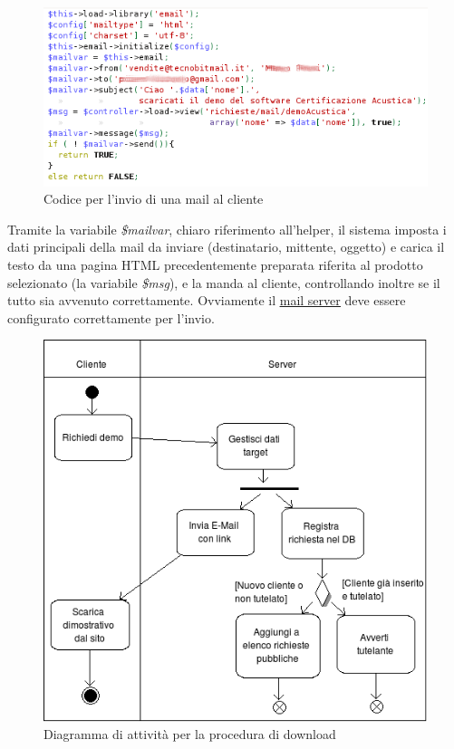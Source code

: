 \begin{figure}[!ht]
\centering
  \includegraphics[scale=0.8]{./images/codiceinviomail.png}
\caption{Codice per l'invio di una mail al cliente}
\label{mail_sending}
\end{figure}

\noindent
Tramite la variabile \textit{\$mailvar}, chiaro riferimento all'helper, il sistema imposta i dati principali della mail da inviare (destinatario, mittente, oggetto) e carica il testo da una pagina HTML precedentemente preparata riferita al prodotto selezionato (la variabile \textit{\$msg}), e la manda al cliente, controllando inoltre se il tutto sia avvenuto correttamente. Ovviamente il \hyperlink{mail_server}{\underline{mail server}} deve essere configurato correttamente per l'invio.
\newpage


\begin{figure}[!ht]
\centering
  \includegraphics[scale=0.75]{./images/downloadAct.png}
\caption{Diagramma di attivit\`a per la procedura di download}
\label{download_act}
\end{figure}

